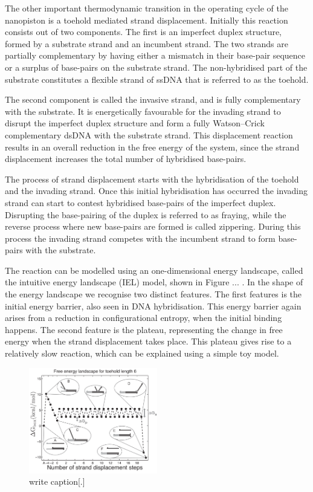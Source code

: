 The other important thermodynamic transition in the operating cycle of the nanopiston
is a toehold mediated strand displacement. Initially this reaction consists out of two
components. The first is an imperfect duplex structure, formed by a substrate strand and
an incumbent strand. The two strands are partially complementary by having either a
mismatch in their base-pair sequence or a surplus of base-pairs on the substrate strand.
The non-hybridised part of the substrate constitutes a flexible strand of ssDNA
that is referred to as the toehold.

The second component is called the invasive strand, and is fully complementary with the
substrate. It is energetically favourable for the invading
strand to disrupt the imperfect duplex structure and form a fully Watson–Crick
complementary dsDNA with the substrate strand. This displacement reaction results in an
overall reduction in the free energy of the system, since the strand displacement
increases the total number of hybridised base-pairs.

The process of strand displacement starts with the hybridisation of the toehold and the
invading strand. Once this initial hybridisation has occurred the invading strand can
start to contest hybridised base-pairs of the imperfect duplex. Disrupting the
base-pairing of the duplex is referred to as fraying, while the reverse process
where new base-pairs are formed is called zippering. During this process the invading
strand competes with the incumbent strand to form base-pairs with the substrate.

The reaction can be modelled using an one-dimensional energy landscape, called the
intuitive energy landscape (IEL) model\cite{Srinivas2013}, shown in Figure ... . In the
shape of the
energy landscape we recognise two distinct features. The first features is the initial
energy barrier, also seen in DNA hybridisation. This energy barrier again arises from a
reduction in configurational entropy, when the initial binding happens. The second
feature is the plateau, representing the change in free energy when the strand
displacement takes place. This plateau gives rise to a relatively slow reaction, which
can be explained using a simple toy model.\\

\begin{figure}[ht]
\begin{center}
  \includegraphics[width=0.5\textwidth]{Figures/ToeholdDiagram.png}
  \caption{write caption[.]}
\end{center}
\end{figure}

